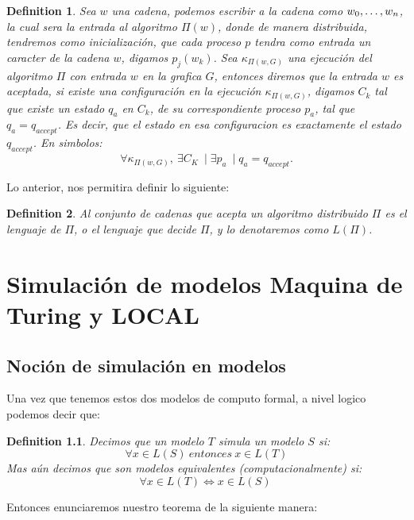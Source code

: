 \documentclass[10pt]{report}
\newtheorem{definition}{Definition}
\begin{document}
    \theoremstyle{definition}
    \begin{definition}
        Sea $w$ una cadena, podemos escribir a la cadena como $w_{0},\mathellipsis, w_{n}$, la cual sera la entrada al algoritmo
        $\Pi(w)$, donde de manera distribuida, tendremos como inicialización, que cada proceso $p$ tendra como entrada un caracter de la cadena $w$, digamos $p_{j}(w_{k})$.\newline
        Sea $\kappa_{\Pi(w,G)}$ una ejecución del algoritmo $\Pi$ con entrada $w$ en la grafica $G$, entonces diremos que
        la entrada $w$ es aceptada, si existe una configuración en la ejecución $\kappa_{\Pi(w,G)}$, digamos $C_{k}$ tal que
        existe un estado $q_{a}$ en $C_{k}$, de su correspondiente proceso $p_{a}$, tal que $q_{a}=q_{accept}$.\newline
        Es decir, que el estado en esa configuracion es exactamente el estado $q_{accept}$.\newline
        En simbolos:
        \begin{equation}
            \forall \kappa_{\Pi(w,G)},\ \exists C_{K}\ \mid \exists p_{a}\ \mid q_{a}=q_{accept}.\label{eq:equation4}
        \end{equation}
    \end{definition}

    Lo anterior, nos permitira definir lo siguiente:
    \begin{definition}
        Al conjunto de cadenas que acepta un algoritmo distribuido $\Pi$ es el lenguaje
        de $\Pi$, o el lenguaje que decide $\Pi$, y lo denotaremos como $L(\Pi)$.
    \end{definition}


    \chapter{Simulación de modelos Maquina de Turing y \textbf{LOCAL}}\label{ch:simulacion-de-modelostextbfytextbf}
    \section{Noción de simulación en modelos}\label{sec:nocion-de-simulación-en-modelos}
    Una vez que tenemos estos dos modelos de computo formal, a nivel logico podemos decir que:
    \theoremstyle{definition}
    \begin{definition}
        Decimos que un modelo $T$ simula un modelo $S$ si:
        \begin{equation}
        \forall x\in L(S) \ entonces \ x\in L(T)
        \end{equation}
        Mas aún decimos que son modelos equivalentes (computacionalmente) si:
        \begin{equation}
        \forall x\in L(T) \iff x\in L(S) \
        \end{equation}
    \end{definition}
    \space
    Entonces enunciaremos nuestro teorema de la siguiente manera:
\end{document}
